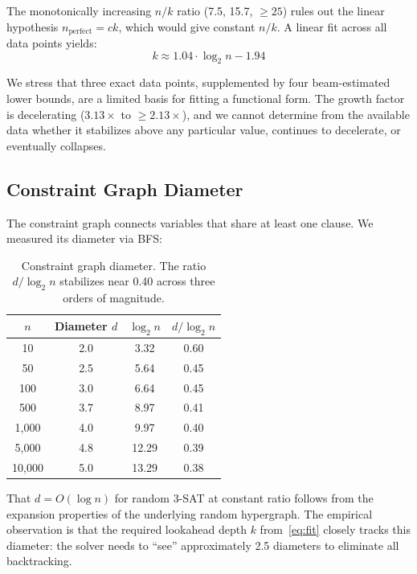 \documentclass[11pt,a4paper]{article}
\begin{document}
The monotonically increasing $n/k$ ratio (7.5, 15.7, ${\geq}25$) rules out the linear hypothesis $n_{\mathrm{perfect}} = ck$, which would give constant $n/k$. A linear fit across all data points yields:
\begin{equation}\label{eq:fit}
    k \approx 1.04 \cdot \log_2 n - 1.94
\end{equation}

We stress that three exact data points, supplemented by four beam-estimated lower bounds, are a limited basis for fitting a functional form. The growth factor is decelerating ($3.13\times$ to ${\geq}2.13\times$), and we cannot determine from the available data whether it stabilizes above any particular value, continues to decelerate, or eventually collapses.

\subsection{Constraint Graph Diameter}\label{sec:diameter}

The constraint graph connects variables that share at least one clause. We measured its diameter via BFS:

\begin{table}[h]
\centering
\begin{tabular}{@{}cccc@{}}
\toprule
$n$ & Diameter $d$ & $\log_2 n$ & $d / \log_2 n$ \\
\midrule
10     & 2.0 & 3.32  & 0.60 \\
50     & 2.5 & 5.64  & 0.45 \\
100    & 3.0 & 6.64  & 0.45 \\
500    & 3.7 & 8.97  & 0.41 \\
1{,}000  & 4.0 & 9.97  & 0.40 \\
5{,}000  & 4.8 & 12.29 & 0.39 \\
10{,}000 & 5.0 & 13.29 & 0.38 \\
\bottomrule
\end{tabular}
\caption{Constraint graph diameter. The ratio $d/\log_2 n$ stabilizes near 0.40 across three orders of magnitude.}
\label{tab:diameter}
\end{table}

That $d = O(\log n)$ for random 3-SAT at constant ratio follows from the expansion properties of the underlying random hypergraph. The empirical observation is that the required lookahead depth $k$ from~\eqref{eq:fit} closely tracks this diameter: the solver needs to ``see'' approximately 2.5 diameters to eliminate all backtracking.
\end{document}
